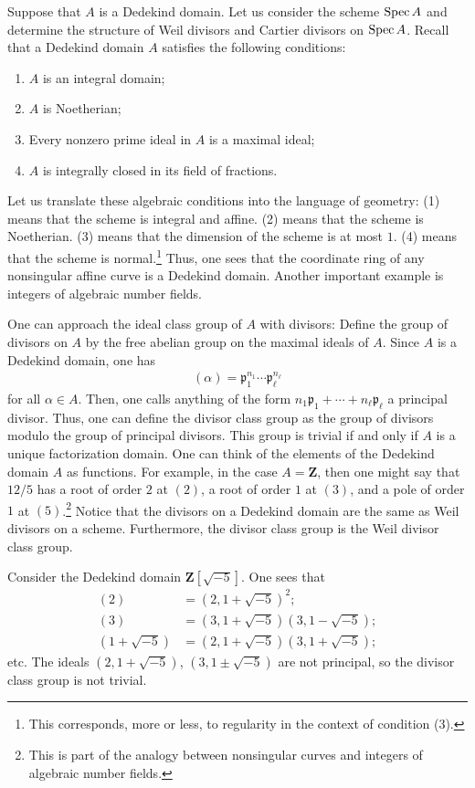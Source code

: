 \documentclass [11 pt, oneside] {article}
\begin{document}
Suppose that $A$ is a Dedekind domain. Let us consider the scheme $\operatorname{Spec} A$ and determine the structure of Weil divisors and Cartier divisors on $\operatorname{Spec} A$. Recall that a Dedekind domain $A$ satisfies the following conditions:
\begin{enumerate}
	\item $A$ is an integral domain;
	\item $A$ is Noetherian;
	\item Every nonzero prime ideal in $A$ is a maximal ideal;
	\item $A$ is integrally closed in its field of fractions.
\end{enumerate}
Let us translate these algebraic conditions into the language of geometry: (1) means that the scheme is integral and affine.  (2) means that the scheme is Noetherian. (3) means that the dimension of the scheme is at most $1$.  (4) means that the scheme is normal.\footnote{This corresponds, more or less, to regularity in the context of condition (3).} Thus, one sees that the coordinate ring of any nonsingular affine curve is a Dedekind domain. Another important example is integers of algebraic number fields.

One can approach the ideal class group of $A$ with divisors: Define the group of divisors on $A$ by the free abelian group on the maximal ideals of $A$. Since $A$ is a Dedekind domain, one has
\begin{align*}
	(\alpha) =  \mathfrak{p}_1^{n_1}\cdots\mathfrak{p}_\ell^{n_\ell}
\end{align*}
for all $\alpha \in A$. Then, one calls anything of the form $n_1\mathfrak{p}_1+\cdots+n_\ell\mathfrak{p}_\ell$ a principal divisor.
Thus, one can define the divisor class group as the group of divisors modulo the group of principal divisors.
This group is trivial if and only if $A$ is a unique factorization domain.
One can think of the elements of the Dedekind domain $A$ as functions. For example, in the case $A=\mathbf{Z}$, then one might say that $12/5$ has a root of order $2$ at $(2)$, a root of order $1$ at $(3)$, and a pole of order $1$ at $(5)$.\footnote{This is part of the analogy between nonsingular curves and integers of algebraic number fields.}
Notice that the divisors on a Dedekind domain are the same as Weil divisors on a scheme. Furthermore, the divisor class group is the Weil divisor class group.

\begin{example}[ ]\label{}\text{}
Consider the Dedekind domain $\mathbf{Z}[\sqrt{-5} ]$. One sees that
\begin{align*}
	(2)&=  (2,1+\sqrt{-5} )^2;\\
	(3) &=  (3,1+\sqrt{-5} ) (3,1-\sqrt{-5} ) ;\\
	(1+\sqrt{-5} ) &= (2,1+\sqrt{-5} ) (3,1+\sqrt{-5} ) ;
\end{align*}
etc. The ideals $(2,1+\sqrt{-5} )$, $(3,1\pm \sqrt{-5} )$ are not principal, so the divisor class group is not trivial.
\end{example}
\end{document}
